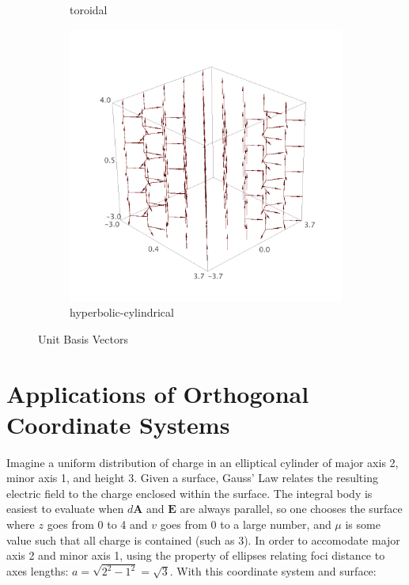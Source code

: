 \documentclass{article}
\begin{document}
\begin{figure}
\begin{subfigure}[b]{0.3\textwidth}
        \caption{toroidal}
    \end{subfigure}
    \begin{subfigure}[b]{0.3\textwidth}
        \includegraphics[width=\textwidth]{images/hyperbolic_bases.png}
        \caption{hyperbolic-cylindrical}
    \end{subfigure}
\caption{Unit Basis Vectors}
\end{figure}


\section*{Applications of Orthogonal Coordinate Systems}
\label{sec:convenient}

Imagine a uniform distribution of charge in an elliptical cylinder of major axis 2, minor axis 1, and height 3. Given a surface, Gauss' Law relates the resulting electric field to the charge enclosed within the surface. The integral body is easiest to evaluate when $d \textbf{A}$ and $\textbf{E}$ are always parallel, so one chooses the surface where $z$ goes from 0 to 4 and $v$ goes from 0 to a large number, and $\mu$ is some value such that all charge is contained (such as 3). In order to accomodate major axis 2 and minor axis 1, using the property of ellipses relating foci distance to axes lengths: $a = \sqrt{2^2 - 1^2} = \sqrt{3}$. With this coordinate system and surface:
\end{document}
